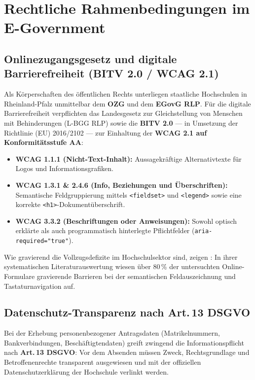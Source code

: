 \section{Rechtliche Rahmenbedingungen im E-Government}
\label{sec:rechtliche_grundlagen}

\subsection{Onlinezugangsgesetz und digitale Barrierefreiheit (BITV 2.0 / WCAG 2.1)}
\label{subsec:bitv_wcag}

Als Körperschaften des öffentlichen Rechts unterliegen staatliche Hochschulen in Rhein\-land-Pfalz unmittelbar dem \textbf{OZG} und dem \textbf{EGovG RLP}. Für die digitale Barrierefreiheit verpflichten das Landesgesetz zur Gleichstellung von Menschen mit Behinderungen (L-BGG RLP) sowie die \textbf{BITV 2.0} --- in Umsetzung der Richtlinie (EU) 2016/2102 --- zur Einhaltung der \textbf{WCAG 2.1 auf Konformitätsstufe AA}:
\begin{itemize}
    \item \textbf{WCAG 1.1.1 (Nicht-Text-Inhalt):} Aussagekräftige Alternativtexte für Logos und Informationsgrafiken.
    \item \textbf{WCAG 1.3.1 \& 2.4.6 (Info, Beziehungen und Überschriften):} Semantische Feldgruppierung mittels \texttt{<fieldset>} und \texttt{<legend>} sowie eine korrekte \texttt{<h1>}-Dokumentüberschrift.
    \item \textbf{WCAG 3.3.2 (Beschriftungen oder Anweisungen):} Sowohl optisch erklärte als auch programmatisch hinterlegte Pflichtfelder (\texttt{aria-required="true"}).
\end{itemize}
Wie gravierend die Vollzugsdefizite im Hochschulsektor sind, zeigen \textcite{inal2020web}: In ihrer systematischen Literaturauswertung wiesen über 80\,\% der untersuchten Online-Formulare gravierende Barrieren bei der semantischen Feldauszeichnung und Tastaturnavigation auf.

\subsection{Datenschutz-Transparenz nach \texorpdfstring{Art.\,13}{Art. 13} DSGVO}
\label{subsec:dsgvo_transparenz}

Bei der Erhebung personenbezogener Antragsdaten (Matrikelnummern, Bankverbindungen, Beschäftigtendaten) greift zwingend die Informationspflicht nach \textbf{Art.\,13 DSGVO}: Vor dem Absenden müssen Zweck, Rechtsgrundlage und Betroffenenrechte transparent ausgewiesen und mit der offiziellen Datenschutzerklärung der Hochschule verlinkt werden.

